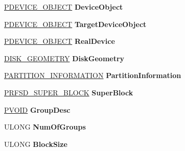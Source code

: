 \begin{DoxyCompactItemize}
\hyperlink{struct___d_e_v_i_c_e___o_b_j_e_c_t}{P\+D\+E\+V\+I\+C\+E\+\_\+\+O\+B\+J\+E\+CT} {\bfseries Device\+Object}
\item 
\mbox{\label{struct___r_f_s_d___v_c_b_a2e1acb46005d2746b3fdba3bc32988e6}} 
\hyperlink{struct___d_e_v_i_c_e___o_b_j_e_c_t}{P\+D\+E\+V\+I\+C\+E\+\_\+\+O\+B\+J\+E\+CT} {\bfseries Target\+Device\+Object}
\item 
\mbox{\label{struct___r_f_s_d___v_c_b_a9ce38ded8191526b2b91789a2adc53b7}} 
\hyperlink{struct___d_e_v_i_c_e___o_b_j_e_c_t}{P\+D\+E\+V\+I\+C\+E\+\_\+\+O\+B\+J\+E\+CT} {\bfseries Real\+Device}
\item 
\mbox{\label{struct___r_f_s_d___v_c_b_aebbcab11c6f8c7d9ffa13e3d09bd9b31}} 
\hyperlink{struct___d_i_s_k___g_e_o_m_e_t_r_y}{D\+I\+S\+K\+\_\+\+G\+E\+O\+M\+E\+T\+RY} {\bfseries Disk\+Geometry}
\item 
\mbox{\label{struct___r_f_s_d___v_c_b_ad9d006f254d5279cbbe23609a6adb29a}} 
\hyperlink{struct___p_a_r_t_i_t_i_o_n___i_n_f_o_r_m_a_t_i_o_n}{P\+A\+R\+T\+I\+T\+I\+O\+N\+\_\+\+I\+N\+F\+O\+R\+M\+A\+T\+I\+ON} {\bfseries Partition\+Information}
\item 
\mbox{\label{struct___r_f_s_d___v_c_b_aeddc9fa71dac2907e90dc8de12b37345}} 
\hyperlink{struct___r_f_s_d___s_u_p_e_r___b_l_o_c_k}{P\+R\+F\+S\+D\+\_\+\+S\+U\+P\+E\+R\+\_\+\+B\+L\+O\+CK} {\bfseries Super\+Block}
\item 
\mbox{\label{struct___r_f_s_d___v_c_b_a1483379547b16aa1cea717ccbe94ecf3}} 
\hyperlink{interfacevoid}{P\+V\+O\+ID} {\bfseries Group\+Desc}
\item 
\mbox{\label{struct___r_f_s_d___v_c_b_a4f63ca8f52f8a7bbee638006254a8e95}} 
U\+L\+O\+NG {\bfseries Num\+Of\+Groups}
\item 
\mbox{\label{struct___r_f_s_d___v_c_b_add7a3eae7673791a8f9d842905f411e7}} 
U\+L\+O\+NG {\bfseries Block\+Size}
\item 
\mbox{\label{struct___r_f_s_d___v_c_b_a1e0e045beedccc4145e08eec7307dda5}} 

\end{DoxyCompactItemize}
